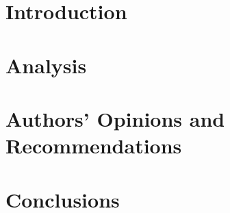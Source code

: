 	\section{Introduction} 
	
	\section{Analysis}
    
    
    
    
    \section{Authors' Opinions and Recommendations}
    
    \section{Conclusions}
    



	


